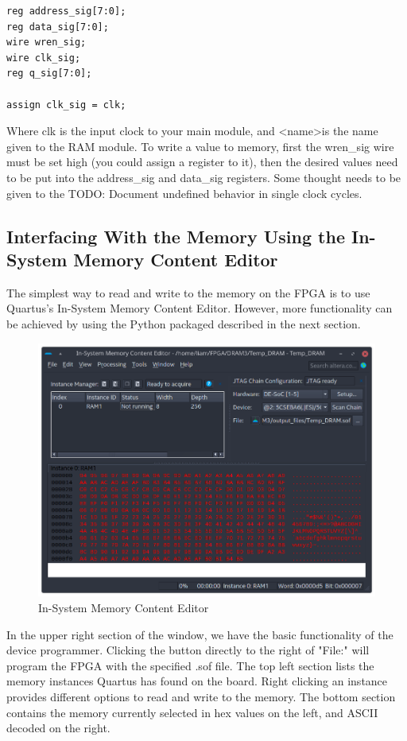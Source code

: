 \documentclass[letter,12pt]{article}
\begin{document}
\begin{verbatim}
reg address_sig[7:0];
reg data_sig[7:0];
wire wren_sig;
wire clk_sig;
reg q_sig[7:0];

assign clk_sig = clk;
\end{verbatim}
Where clk is the input clock to your main module, and \textless name\textgreater is the name given to the RAM module. To write a value to memory, first the wren\_sig wire must be set high (you could assign a register to it), then the desired values need to be put into the address\_sig and data\_sig registers. Some thought needs to be given to the TODO: Document undefined behavior in single clock cycles.

\subsection{Interfacing With the Memory Using the In-System Memory Content Editor}
The simplest way to read and write to the memory on the FPGA is to use Quartus's In-System Memory Content Editor. However, more functionality can be achieved by using the Python packaged described in the next section.
\begin{figure}[H]
  \centering
  \includegraphics[width=\linewidth]{pics/MemoryEditor.png}
  \caption{In-System Memory Content Editor}
\end{figure}

In the upper right section of the window, we have the basic functionality of the device programmer. Clicking the button directly to the right of "File:" will program the FPGA with the specified .sof file. The top left section lists the memory instances Quartus has found on the board. Right clicking an instance provides different options to read and write to the memory. The bottom section contains the memory currently selected in hex values on the left, and ASCII decoded on the right.
\end{document}
